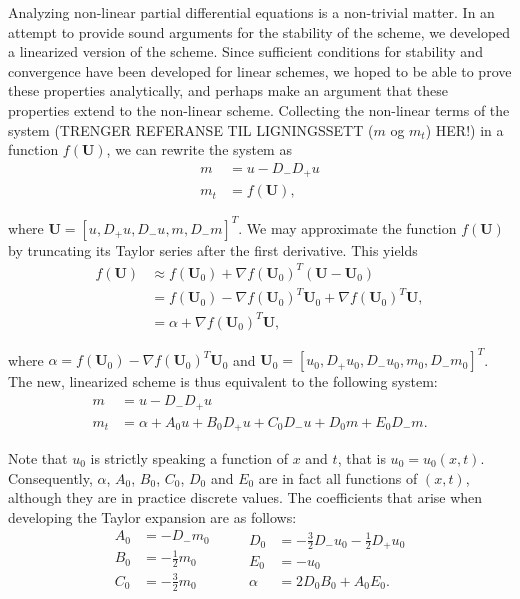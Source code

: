 Analyzing non-linear partial differential equations is a non-trivial matter. In an attempt to provide sound arguments for the stability of the scheme, we developed a linearized version of the scheme. Since sufficient conditions for stability and convergence have been developed for linear schemes, we hoped to be able to prove these properties analytically, and perhaps make an argument that these properties extend to the non-linear scheme. Collecting the non-linear terms of the system (TRENGER REFERANSE TIL LIGNINGSSETT ($m$ og $m_t$) HER!) in a function $f(\bm{U})$, we can rewrite the system as 
\begin{align*}
m &= u - D_{-} D_{+} u \\
m_{t} &= f(\bm{U}),
\end{align*} 

where $\bm{U} = [u, D_+u, D_-u, m, D_-m]^T$. We may approximate the function $f(\bm{U})$ by truncating its Taylor series after the first derivative. This yields
\begin{align*}
f(\bm{U}) &\approx f(\bm{U}_{0}) + \nabla f(\bm{U}_{0})^{T}(\bm{U}-\bm{U}_{0}) \\
&= f(\bm{U}_{0}) - \nabla f(\bm{U}_{0})^{T}\bm{U}_{0} + \nabla f(\bm{U}_{0})^{T}\bm{U}, \\
&= \alpha + \nabla f(\bm{U}_{0})^{T}\bm{U},
\end{align*}

where $\alpha = f(\bm{U}_{0}) - \nabla f(\bm{U}_{0})^{T}\bm{U}_{0}$ and $\bm{U}_0 = [u_0, D_+u_0, D_-u_0, m_0, D_-m_0]^T$. The new, linearized scheme is thus equivalent to the following system:
\begin{align*}
m &= u - D_{-} D_{+} u \\
m_{t} &= \alpha + A_{0}u + B_{0}D_{+}u + C_{0}D_{-}u + D_{0}m + E_{0}D_{-}m.
\end{align*}

Note that $u_0$ is strictly speaking a function of $x$ and $t$, that is $u_0 = u_0 (x, t)$. Consequently, $\alpha$, $A_0$, $B_0$, $C_0$, $D_0$ and $E_0$ are in fact all functions of $(x, t)$, although they are in practice discrete values. The coefficients that arise when developing the Taylor expansion are as follows:
\begin{equation*}
\begin{aligned}
A_{0} &= -D_{-}m_{0} \\
B_{0} &= - \frac{1}{2}m_{0} \\
C_{0} &= - \frac{3}{2}m_{0}
\end{aligned}
\qquad
\begin{aligned}
D_{0} &= - \frac{3}{2}D_{-}u_{0} - \frac{1}{2}D_{+}u_{0} \\
E_{0} &= - u_{0} \\
\alpha &= 2 D_0 B_0 + A_0 E_0.
\end{aligned}
\end{equation*}

